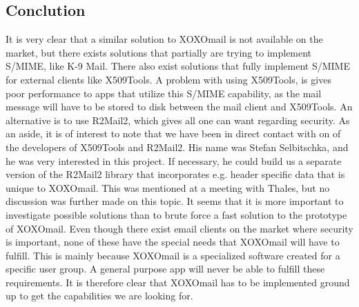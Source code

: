 \subsection{Conclution}
It is very clear that a similar solution to XOXOmail is not available on the market, but there exists solutions that partially are trying to implement S/MIME, like K-9 Mail. There also exist solutions that fully implement S/MIME for external clients like X509Tools. A problem with using X509Tools, is gives poor performance to apps that utilize this S/MIME capability, as the mail message will have to be stored to disk between the mail client and X509Tools. An alternative is to use R2Mail2, which gives all one can want regarding security.
\newline
\newline
As an aside, it is of interest to note that we have been in direct contact with on of the developers of X509Tools and R2Mail2. His name was Stefan Selbitschka, and he was very interested in this project. If necessary, he could build us a separate version of the R2Mail2 library that incorporates e.g. header specific data that is unique to XOXOmail. This was mentioned at a meeting with Thales, but no discussion was further made on this topic. It seems that it is more important to investigate possible solutions than to brute force a fast solution to the prototype of XOXOmail.
\newline
\newline
Even though there exist email clients on the market where security is important, none of these have the special needs that XOXOmail will have to fulfill. This is mainly because XOXOmail is a specialized software created for a specific user group. A general purpose app will never be able to fulfill these requirements. It is therefore clear that XOXOmail has to be implemented ground up to get the capabilities we are looking for.